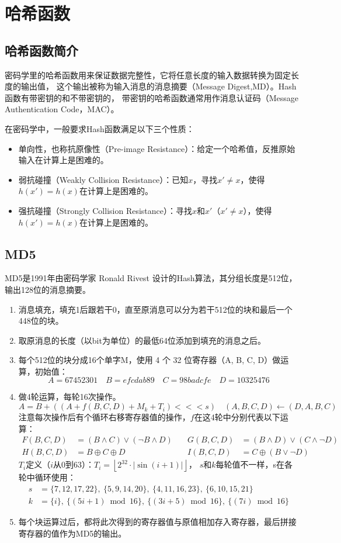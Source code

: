 \section{哈希函数}
\subsection{哈希函数简介}
密码学里的哈希函数用来保证数据完整性，它将任意长度的输入数据转换为固定长度的输出值，
这个输出被称为输入消息的消息摘要（Message Digest,MD）。Hash函数有带密钥的和不带密钥的，
带密钥的哈希函数通常用作消息认证码（Message Authentication Code，MAC）。

在密码学中，一般要求Hash函数满足以下三个性质：
\begin{itemize}
    \item 单向性，也称抗原像性（Pre-image Resistance）：给定一个哈希值，反推原始输入在计算上是困难的。
    \item 弱抗碰撞（Weakly Collision Resistance）：已知$x$，寻找$x' \neq x$，使得$h(x')=h(x)$在计算上是困难的。
    \item 强抗碰撞（Strongly Collision Resistance）：寻找$x$和$x'$（$x' \neq x$），使得$h(x')=h(x)$在计算上是困难的。
\end{itemize}

\subsection{MD5}
MD5是1991年由密码学家 Ronald Rivest 设计的Hash算法，其分组长度是512位，输出128位的消息摘要。
\begin{enumerate}
    \item 消息填充，填充1后跟若干0，直至原消息可以分为若干512位的块和最后一个448位的块。
    \item 取原消息的长度（以bit为单位）的最低64位添加到填充的消息之后。
    \item 每个512位的块分成16个单字M，使用 4 个 32 位寄存器（A, B, C, D）做运算，初始值：
$$
A = 67452301 \quad B = efcdab89 \quad C = 98badcfe \quad D = 10325476
$$
    \item 做4轮运算，每轮16次操作。
$$
A = B + ((A + f(B, C, D) + M_{k} + T_i)<<< s) \quad (A, B, C, D) \leftarrow (D, A, B, C)
$$
注意每次操作后有个循环右移寄存器值的操作，$f$在这4轮中分别代表以下运算：
$$
\begin{aligned}
F(B, C, D) &= (B \land C) \lor (\lnot B \land D) \quad &G(B, C, D) &= (B \land D) \lor (C \land \lnot D) \\
H(B, C, D) &= B \oplus C \oplus D \quad &I(B, C, D) &= C \oplus (B \lor \lnot D)
\end{aligned}
$$
$T_i$定义（$i$从0到63）：$T_i = \left\lfloor 2^{32} \cdot \left| \sin(i + 1) \right| \right\rfloor$，
$s$和$k$每轮值不一样，s在各轮中循环使用：
\begin{align*}
s &= \{7,12,17,22\},\ \{5,9,14,20\},\ \{4,11,16,23\},\ \{6,10,15,21\} \\
k &= \{i\},\ \{(5i + 1) \bmod 16\},\ \{(3i + 5) \bmod 16\},\ \{(7i) \bmod 16\}
\end{align*}
    \item 每个块运算过后，都将此次得到的寄存器值与原值相加存入寄存器，最后拼接寄存器的值作为MD5的输出。
\end{enumerate}

